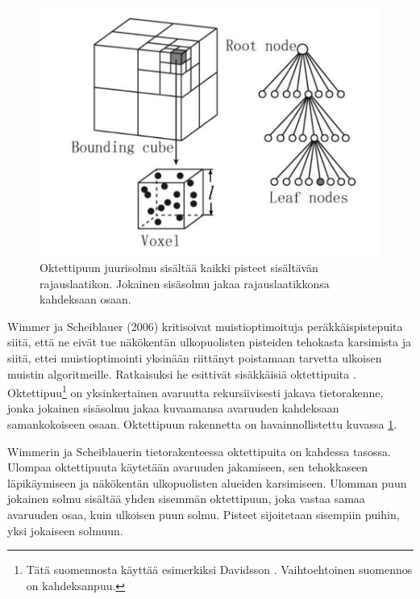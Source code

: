 \begin{figure}
    \centering
    \includegraphics[width=0.5\paperwidth]{img/octree.png}
    \caption{Oktettipuun juurisolmu sisältää kaikki pisteet sisältävän rajauslaatikon. Jokainen sisäsolmu jakaa rajauslaatikkonsa kahdeksaan osaan. \cite{octreekuva}}
    \label{img:octree}
\end{figure}

Wimmer ja Scheiblauer (2006) kritisoivat muistioptimoituja peräkkäispistepuita siitä, että ne eivät tue näkökentän ulkopuolisten pisteiden tehokasta karsimista ja siitä, ettei muistioptimointi yksinään riittänyt poistamaan tarvetta ulkoisen muistin algoritmeille. Ratkaisuksi he esittivät sisäkkäisiä oktettipuita . Oktettipuu\footnote{Tätä suomennosta käyttää esimerkiksi Davidsson \cite{oktettipuu}. Vaihtoehtoinen suomennos on kahdeksanpuu.} on yksinkertainen avaruutta rekursiivisesti jakava tietorakenne, jonka jokainen sisäsolmu jakaa kuvaamansa avaruuden kahdeksaan samankokoiseen osaan. Oktettipuun rakennetta on havainnollistettu kuvassa \ref{img:octree}. 

Wimmerin ja Scheiblauerin tietorakenteessa oktettipuita on kahdessa tasossa. Ulompaa oktettipuuta käytetään avaruuden jakamiseen, sen tehokkaseen läpikäymiseen ja näkökentän ulkopuolisten alueiden karsimiseen. Ulomman puun jokainen solmu sisältää yhden sisemmän oktettipuun, joka vastaa samaa avaruuden osaa, kuin ulkoisen puun solmu. Pisteet sijoitetaan sisempiin puihin, yksi jokaiseen solmuun. \cite{ip}

